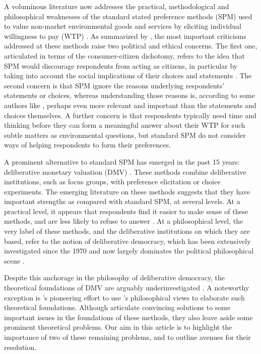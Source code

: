 \documentclass[version=3.21, pagesize, twoside=off, bibliography=totoc, DIV=calc, fontsize=12pt, a4paper, french, english]{scrartcl}
\begin{document}
A voluminous literature now addresses the practical, methodological and philosophical weaknesses of the standard stated preference methods (SPM) used to value non-market environmental goods and services by eliciting individual willingness to pay (WTP) \citep{meinard_ethical_2016} . 
As summarized by \citet{bartkowski_beyond_2018,bartkowski_deliberative_2019}, the most important criticisms addressed at these methods raise two political and ethical concerns. 
The first one, articulated in terms of the consumer-citizen dichotomy, refers to the idea that SPM would discourage respondents from acting as citizens, in particular by taking into account the social implications of their  choices and statements \citep{soma_representing_2014, vatn_institutional_2009}. 
The second concern is that SPM ignore the reasons underlying respondents' statements or choices, whereas understanding those reasons is, according to some authors like \citet{sen_environmental_1995}, perhaps even more relevant and important than the statements and choices themselves. A further concern is that respondents typically need time and thinking before they can form a meaningful answer about their WTP for such subtle matters as environmental questions, but standard SPM do not consider ways of helping respondents to form their preferences.

A prominent alternative to standard SPM has emerged in the past 15 years: deliberative monetary valuation (DMV) \citep{spash_deliberative_2007,bartkowski_economic_2017}. 
These methods combine deliberative institutions, such as focus groups, with preference elicitation or choice experiments. 
The emerging literature on these methods suggests that they have important strengths as compared with standard SPM, at several levels. 
At a practical level, it appears that respondents find it easier to make sense of these methods, and are less likely to refuse to answer \citep{lienhoop_contingent_2007,szabo_reducing_2011}. 
At a philosophical level, the very label of these methods, and the deliberative institutions on which they are based, refer to the notion of deliberative democracy, which has been extensively investigated since the 1970 and now largely dominates the political philosophical scene \citep{chappell_deliberative_2012}.

Despite this anchorage in the philosophy of deliberative democracy, the theoretical foundations of DMV are arguably underinvestigated \citep{bartkowski_economic_2017,bartkowski_beyond_2018,bunse_what_2015,kenter_what_2015}. 
A noteworthy exception is \citet{bartkowski_beyond_2018}'s pioneering effort to use \citet{sen_idea_2009}'s philosophical views to elaborate such theoretical foundations. 
Although \citet{bartkowski_beyond_2018} articulate convincing solutions to some important issues in the foundations of these methods, they also leave aside some prominent theoretical problems. 
Our aim in this article is to highlight the importance of two of these remaining problems, and to outline avenues for their resolution.
\end{document}
